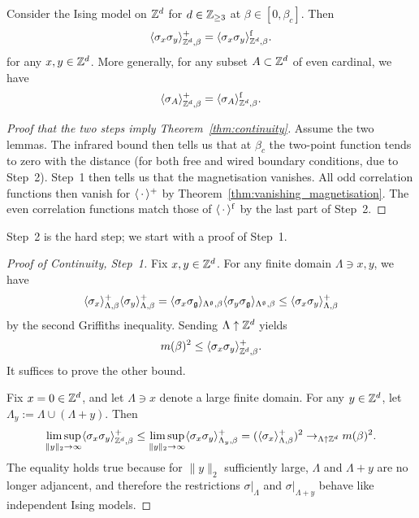 \begin{lemma}
    Consider the Ising model on $\mathbb Z^d$ for $d\in\mathbb Z_{\geq 3}$ at $\beta\in[0,\beta_c]$.
    Then
    \[
        \langle\sigma_x\sigma_y\rangle_{\mathbb Z^d,\beta}^+
        =
        \langle\sigma_x\sigma_y\rangle_{\mathbb Z^d,\beta}^{\operatorname{f}}.
    \]
    for any $x,y\in\mathbb Z^d$.
    More generally, for any subset $A\subset\mathbb Z^d$ of even cardinal, we have
    \[
        \langle\sigma_A\rangle_{\mathbb Z^d,\beta}^+
        =
        \langle\sigma_A\rangle_{\mathbb Z^d,\beta}^{\operatorname{f}}.
    \]
\end{lemma}

\begin{proof}[Proof that the two steps imply Theorem~\ref{thm:continuity}]
    Assume the two lemmas.
    The infrared bound then tells us that at $\beta_c$ the two-point function tends
    to zero with the distance (for both free and wired boundary conditions, due to Step~2).
    Step~1 then tells us that the magnetisation vanishes.
    All odd correlation functions then vanish for $\langle\,\cdot\,\rangle^+$ by
    Theorem~\ref{thm:vanishing_magnetisation}.
    The even correlation functions match those of $\langle\,\cdot\,\rangle^{\operatorname{f}}$ by the last
    part of Step~2.
\end{proof}

Step~2 is the hard step; we start with a proof of Step~1.

\begin{proof}[Proof of Continuity, Step~1]
    Fix $x,y\in\mathbb Z^d$.
    For any finite domain $\Lambda\ni x,y$,
    we have
    \[
        \langle\sigma_x\rangle_{\Lambda,\beta}^+
        \langle\sigma_y\rangle_{\Lambda,\beta}^+
        =
        \langle\sigma_x\sigma_\mathfrak g\rangle_{\Lambda^\mathfrak g,\beta}
        \langle\sigma_y\sigma_\mathfrak g\rangle_{\Lambda^\mathfrak g,\beta}
        \leq
        \langle\sigma_x\sigma_y\rangle_{\Lambda,\beta}^+
    \]
    by the second Griffiths inequality.
    Sending $\Lambda\uparrow\mathbb Z^d$ yields
    \[
        m(\beta)^2\leq \langle\sigma_x\sigma_y\rangle_{\mathbb Z^d,\beta}^+.
    \]
    It suffices to prove the other bound.

    Fix $x=0\in\mathbb Z^d$, and let $\Lambda\ni x$ denote a large finite domain.
    For any $y\in\mathbb Z^d$, let $\Lambda_y:=\Lambda\cup(\Lambda+y)$.
    Then
    \[
        \limsup_{\|y\|_2\to\infty}\langle\sigma_x\sigma_y\rangle_{\mathbb Z^d,\beta}^+
        \leq
        \limsup_{\|y\|_2\to\infty}\langle\sigma_x\sigma_y\rangle_{\Lambda_y,\beta}^+
        =
        (\langle\sigma_x\rangle_{\Lambda,\beta}^+)^2
        \to_{\Lambda\uparrow\mathbb Z^d}m(\beta)^2.
    \]
    The equality holds true because for $\|y\|_2$ sufficiently large,
    $\Lambda$ and $\Lambda+y$ are no longer adjancent,
    and therefore the restrictions $\sigma|_\Lambda$
    and $\sigma|_{\Lambda+y}$ behave like independent Ising models.
\end{proof}

